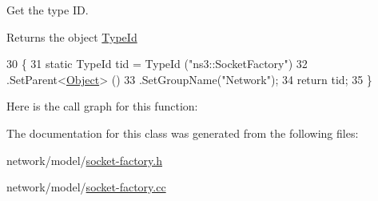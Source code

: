 Get the type ID. 

\begin{DoxyReturn}{Returns}
the object \hyperlink{classns3_1_1TypeId}{Type\+Id} 
\end{DoxyReturn}

\begin{DoxyCode}
30 \{
31   \textcolor{keyword}{static} TypeId tid = TypeId (\textcolor{stringliteral}{"ns3::SocketFactory"})
32     .SetParent<\hyperlink{classns3_1_1Object_a40860402e64d8008fb42329df7097cdb}{Object}> ()
33     .SetGroupName(\textcolor{stringliteral}{"Network"});
34   \textcolor{keywordflow}{return} tid;
35 \}
\end{DoxyCode}


Here is the call graph for this function\+:




The documentation for this class was generated from the following files\+:\begin{DoxyCompactItemize}
\item 
network/model/\hyperlink{socket-factory_8h}{socket-\/factory.\+h}\item 
network/model/\hyperlink{socket-factory_8cc}{socket-\/factory.\+cc}\end{DoxyCompactItemize}
